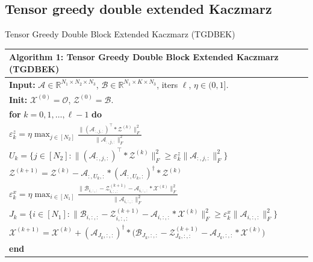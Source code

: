 \documentclass[aspectratio=169]{beamer}
\begin{document}
\subsection{Tensor greedy double extended Kaczmarz}

\begin{frame}[t]{Tensor Greedy Double Block Extended Kaczmarz (TGDBEK)}
\scriptsize
\setlength{\tabcolsep}{2pt}
\renewcommand{\arraystretch}{1.05}

\begin{center}
\begin{tabular*}{\linewidth}{@{\extracolsep{\fill}}l@{}}
\toprule
{\bf Algorithm 1:} Tensor Greedy Double Block Extended Kaczmarz (TGDBEK)\\
\midrule
{\bf Input:} $\mathcal{A}\!\in\!\mathbb{R}^{N_1\times N_2\times N_3}$, $\mathcal{B}\!\in\!\mathbb{R}^{N_1\times K\times N_3}$, iters $\ell$, $\eta\in(0,1]$.\\
{\bf Init:} $\mathcal{X}^{(0)}=\mathcal{O}$, $\mathcal{Z}^{(0)}=\mathcal{B}$.\\
{\bf for} $k=0,1,\ldots,\ell-1$ {\bf do}\\
\quad $\displaystyle \varepsilon_k^{z}=\eta\max_{j\in[N_2]}
\frac{\|(\mathcal{A}_{:,j,:})^\top * \mathcal{Z}^{(k)}\|_{F}^2}{\|\mathcal{A}_{:,j,:}\|_{F}^2}$\\[-0.2em]
\quad $\displaystyle U_k=\Big\{j\in[N_2]:\|(\mathcal{A}_{:,j,:})^\top * \mathcal{Z}^{(k)}\|_{F}^2\ge
\varepsilon_k^{z}\|\mathcal{A}_{:,j,:}\|_{F}^2\Big\}$\\[-0.2em]
\quad $\displaystyle \mathcal{Z}^{(k+1)}=\mathcal{Z}^{(k)}-\mathcal{A}_{:,U_k,:}*(\mathcal{A}_{:,U_k,:})^\dagger*\mathcal{Z}^{(k)}$\\[-0.1em]
\quad $\displaystyle \varepsilon_k^{x}=\eta\max_{i\in[N_1]}
\frac{\|\mathcal{B}_{i,:,:}-\mathcal{Z}^{(k+1)}_{i,:,:}-\mathcal{A}_{i,:,:}*\mathcal{X}^{(k)}\|_{F}^2}{\|\mathcal{A}_{i,:,:}\|_{F}^2}$\\[-0.2em]
\quad $\displaystyle J_k=\Big\{i\in[N_1]:\|\mathcal{B}_{i,:,:}-\mathcal{Z}^{(k+1)}_{i,:,:}-\mathcal{A}_{i,:,:}*\mathcal{X}^{(k)}\|_{F}^2\ge
\varepsilon_k^{x}\|\mathcal{A}_{i,:,:}\|_{F}^2\Big\}$\\[-0.2em]
\quad $\displaystyle \mathcal{X}^{(k+1)}=\mathcal{X}^{(k)}+(\mathcal{A}_{J_k,:,:})^\dagger*
\Big(\mathcal{B}_{J_k,:,:}-\mathcal{Z}^{(k+1)}_{J_k,:,:}-\mathcal{A}_{J_k,:,:}*\mathcal{X}^{(k)}\Big)$\\
{\bf end}\\
\bottomrule
\end{tabular*}
\end{center}
\end{frame}
\end{document}
